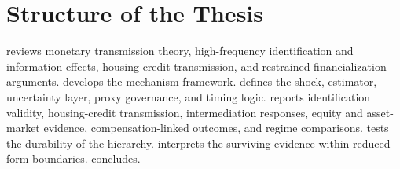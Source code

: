 \section{Structure of the Thesis}

 reviews monetary transmission theory, high-frequency identification and information effects, housing-credit transmission, and restrained financialization arguments.  develops the mechanism framework.  defines the shock, estimator, uncertainty layer, proxy governance, and timing logic.  reports identification validity, housing-credit transmission, intermediation responses, equity and asset-market evidence, compensation-linked outcomes, and regime comparisons.  tests the durability of the hierarchy.  interprets the surviving evidence within reduced-form boundaries.  concludes.
